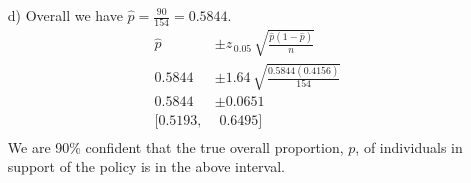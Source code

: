 \documentclass[12pt]{article}
\begin{document}
{\begin{minipage}[t]{0.98\textwidth}
\begin{minipage}[t]{0.48\textwidth}
\begin{enumerate}
60.34\% of 116 $\Rightarrow$\! $0.6034(116) = 70$ individuals.\\[0.3cm]
$\Rightarrow$ $20+90 = 90$ individuals overall from the group of $154$ who are in favour of the policy.
\item[d)] Overall we have $\hat p = \frac{90}{154} = 0.5844.$
\begin{align*}
\hat p &\pm z_{\,0.05} \, \sqrt{\frac{\hat p(1- \hat p)}{n}} \\[0.2cm]
0.5844 &\pm 1.64 \, \sqrt{\frac{0.5844(0.4156)}{154}} \\[0.2cm]
0.5844 &\pm 0.0651 \\[0.1cm]
[0.5193,&\,\,0.6495]\\[-0.8cm]
\end{align*}
We are 90\% confident that the true overall proportion, $p$, of individuals in support of the policy is in the above interval.
\end{enumerate}
\end{minipage}
\end{minipage}}\vspace{0.03\textwidth}
\end{document}
